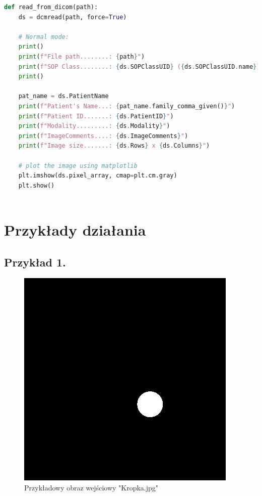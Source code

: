 \documentclass[a4paper,11pt]{article}
\begin{document}
  \begin{lstlisting}[language=Python, caption=read DICOM file, basicstyle=\tiny]
def read_from_dicom(path):
    ds = dcmread(path, force=True)

    # Normal mode:
    print()
    print(f"File path........: {path}")
    print(f"SOP Class........: {ds.SOPClassUID} ({ds.SOPClassUID.name})")
    print()

    pat_name = ds.PatientName
    print(f"Patient's Name...: {pat_name.family_comma_given()}")
    print(f"Patient ID.......: {ds.PatientID}")
    print(f"Modality.........: {ds.Modality}")
    print(f"ImageComments....: {ds.ImageComments}")
    print(f"Image size.......: {ds.Rows} x {ds.Columns}")

    # plot the image using matplotlib
    plt.imshow(ds.pixel_array, cmap=plt.cm.gray)
    plt.show()
    
  \end{lstlisting}

  \section{Przykłady działania}
  \subsection{Przykład 1.}
  
  \begin{figure}[H]
    \centering
    \includegraphics[scale=0.5]{Kropka.jpg}
    \caption{Przykładowy obraz wejściowy "Kropka.jpg"}
  \end{figure}
  
\end{document}
